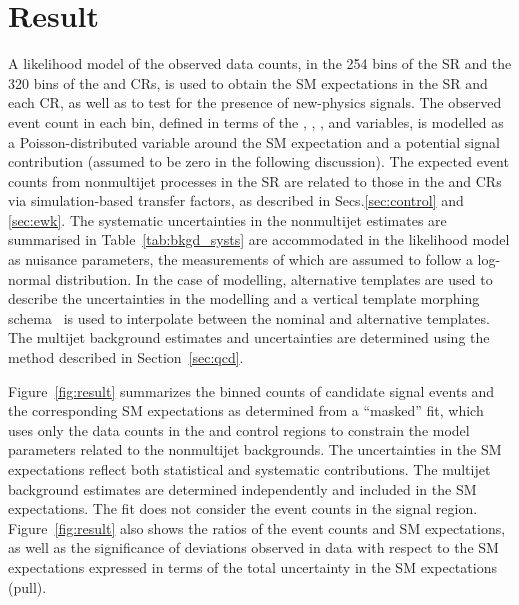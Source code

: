 
\section{Result}
\label{sec:result}

A likelihood model of the observed data counts, in the 254 bins of the
SR and the 320 bins of the \mj and \mmj CRs, is used to obtain the SM
expectations in the SR and each CR, as well as to test for the
presence of new-physics signals. The observed event count in each bin,
defined in terms of the \njet, \nb, \scalht, and \mht variables, is
modelled as a Poisson-distributed variable around the SM expectation
and a potential signal contribution (assumed to be zero in the
following discussion). The expected event counts from nonmultijet
processes in the SR are related to those in the \mj and \mmj CRs via
simulation-based transfer factors, as described in
Secs.\ref{sec:control} and \ref{sec:ewk}. The systematic uncertainties
in the nonmultijet estimates are summarised in
Table~\ref{tab:bkgd_systs} are accommodated in the likelihood model as
nuisance parameters, the measurements of which are assumed to follow a
log-normal distribution. In the case of \mht modelling, alternative
templates are used to describe the uncertainties in the \mht modelling
and a vertical template morphing schema~\cite{Prosper:2011zz,
  Khachatryan:2016dvc} is used to interpolate between the nominal and
alternative templates. The multijet background estimates and
uncertainties are determined using the method described in
Section~\ref{sec:qcd}.

Figure~\ref{fig:result} summarizes the binned counts of candidate
signal events and the corresponding SM expectations as determined from
a ``masked'' fit, which uses only the data counts in the \mj and \mmj
control regions to constrain the model parameters related to the
nonmultijet backgrounds. The uncertainties in the SM expectations
reflect both statistical and systematic contributions. The multijet
background estimates are determined independently and included in the
SM expectations. The fit does not consider the event counts in the
signal region. Figure~\ref{fig:result} also shows the ratios of the
event counts and SM expectations, as well as the significance of
deviations observed in data with respect to the SM expectations
expressed in terms of the total uncertainty in the SM expectations
(pull). 

